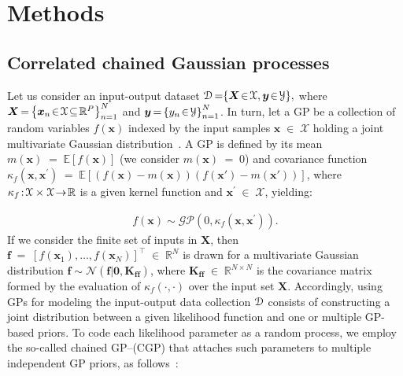 \documentclass[journal]{IEEEtran}
\providecommand{\ve}[1]{{\bm{#1}}}%
\providecommand{\mat}[1]{{\bm{#1}}} %
\newcommand{\Real}{\mathbb{R}}
\DeclareMathOperator{\en}{\!\,\in\!\,}
\DeclareMathOperator{\igual}{\!\,=\!\,}
\providecommand{\s}[1]{\negthinspace#1\negthinspace}%
\newcommand{\ex}[1]{\mathbb{E}[#1]}
\providecommand{\ve}[1]{{\mathbf{#1}}}
\providecommand{\mat}[1]{{\mathbf{#1}}}
\newcommand{\dataset}{{\cal D}} %
\newcommand{\gauss}{\mathcal{N}} %
\begin{document}
\section{Methods}\label{sec:methods}

\subsection{Correlated chained Gaussian processes}

Let us consider an input-output dataset $\dataset\igual\{\ve{X}\s{\in}\mathcal{X},\ve{y}\s{\in}\mathcal{Y}\},$ where $\mat{X}\igual \left\{\ve{x}_n\s{\in}\mathcal{X}\!\subseteq\!\Real^P\right\}_{n=1}^{N}$ and $\mat{y}\igual\left\{y_n\s{\in} \mathcal{Y}\right\}_{n=1}^{N}$. In turn, let a GP be a collection of random variables $f(\ve{x})$ indexed by the input samples $\ve{x}\en \mathcal{X}$ holding a joint multivariate Gaussian distribution~\cite{rasmussen2006gaussian}. A GP is defined by its mean $m(\ve{x})\igual \ex{f(\ve{x})}$ (we consider $m(\ve{x})\igual0$) and covariance function $\kappa_f(\ve{x}, \ve{x^{\prime}})\igual \ex{(f(\ve{x})-m(\ve{x}))(f(\ve{x'})-m(\ve{x'}))}$, where $\kappa_f\s{:}\mathcal{X}\times\mathcal{X}\s{\to}\Real$ is a given kernel function and $\ve{x}^\prime\en\mathcal{X}$, yielding:

\begin{align} f(\ve{x}) \sim \mathcal{GP} (0, \kappa_f(\ve{x}, \ve{x^{\prime}})).
\end{align}
If we consider the finite set of inputs in $\mat{X}$, then $\ve{f}\igual\left[f(\ve{x}_1), \dots , f(\ve{x}_N)\right]^{\top}\en \Real^{N}$ is drawn for a multivariate Gaussian distribution $\ve{f} \sim \gauss(\ve{f}|\ve{0},\mat{K}_{\ve{f}\ve{f}})$, where $\mat{K}_{\ve{f}\ve{f}}\en\Real^{N\times N}$ is the covariance matrix formed by the evaluation of $\kappa_f(\cdot,\cdot)$ over the input set $\mat{X}$.
Accordingly, using GPs for modeling the input-output data collection $\dataset$ consists of constructing a joint distribution between a given likelihood function and one or multiple GP-based priors. To code each likelihood parameter as a random process, we employ the so-called chained GP--(CGP) that attaches such parameters to multiple independent GP priors, as follows~\cite{saul2016chained}:
\end{document}
